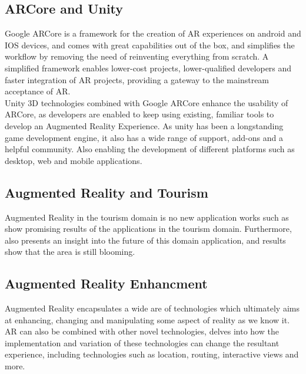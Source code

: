
\subsection{ARCore and Unity}
Google ARCore is a framework for the creation of AR experiences on android and IOS devices, and comes with great capabilities out of the box, and simplifies the workflow 
by removing the need of reinventing everything from scratch. 
A simplified framework enables lower-cost projects\cite{Huang2019}, lower-qualified developers and faster integration of AR projects, 
providing a gateway to the mainstream acceptance of AR.\\
Unity 3D technologies combined with Google ARCore enhance the usability of ARCore, as developers are enabled to keep using existing, 
familiar tools to develop an Augmented Reality Experience. As unity has been a longstanding game development engine, it also has a wide range of support, 
add-ons and a helpful community. Also enabling the development of different platforms such as desktop, web and mobile applications\cite{Greene2018}.
\subsection{Augmented Reality and Tourism}
Augmented Reality in the tourism domain is no new application works such as \cite{OZKUL2019} show promising results of the applications in the tourism domain.
Furthermore, \cite{JingenLiang2021} also presents an insight into the future of this domain application, and results show that the area is still blooming.


\subsection{Augmented Reality Enhancment}
Augmented Reality encapsulates a wide are of technologies which ultimately aims at enhancing, changing and manipulating some aspect of reality as we know it. AR can also be combined with other novel technologies, 
\cite{Keckes2017} delves into how the implementation and variation of these technologies can change the resultant experience, including technologies such as location, routing, interactive views and more. 

